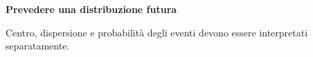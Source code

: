 \documentclass[12pt,aspectratio=1610]{beamer}
\begin{document}
\begin{frame}[plain]\hypertarget{slide8}{}
\begin{lrbox}{\TitleBox}
\begin{minipage}[t]{17.7cm}\raggedright\color{Ink}\fontsize{11.3}{14.8}\selectfont
\color{Navy}\bfseries\fontsize{20.6}{24.5}\selectfont Prevedere una distribuzione futura
\end{minipage}\end{lrbox}

\begin{lrbox}{\RecallBox}
\begin{minipage}[t]{14.3cm}\raggedright\color{Ink}\fontsize{11.3}{14.8}\selectfont
\fontsize{10.3}{13.8}\selectfont Centro, dispersione e probabilità degli eventi devono essere interpretati separatamente.
\end{minipage}\end{lrbox}


\end{frame}
\end{document}
